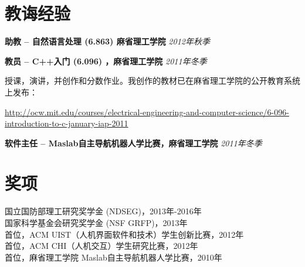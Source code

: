 \documentclass[margin,line]{resume}
\begin{document}
\begin{resume}
\section{\mysidestyle 教诲经验}

\textbf{助教 -- 自然语言处理 (6.863) 麻省理工学院} \hfill \textsl{2012年秋季} \\

\vspace{-5mm}

\textbf{教员 -- C++入门 (6.096) ，麻省理工学院} \hfill \textsl{2011年冬季}\\

\vspace{-4mm}

\vspace{-4mm}

授课，演讲，并创作和分数作业。我创作的教材已在麻省理工学院的公开教育系统上发布：

\vspace{-4mm}

\url{http://ocw.mit.edu/courses/electrical-engineering-and-computer-science/6-096-introduction-to-c-january-iap-2011} \\

\vspace{-5mm}

\textbf{软件主任 -- Maslab自主导航机器人学比赛，麻省理工学院} \hfill \textsl{2011年冬季}\\

\vspace{-4mm}

\section{\mysidestyle 奖项}

国立国防部理工研究奖学金 (NDSEG)，2013年-2016年 \\
国家科学基金会研究奖学金 (NSF GRFP)，2013年 \\
首位，ACM UIST（人机界面软件和技术）学生创新比赛，2012年 \\
首位，ACM CHI（人机交互）学生研究比赛，2012年 \\
首位，麻省理工学院 Maslab自主导航机器人学比赛，2010年 \\

\pagebreak



\end{resume}
\end{document}
